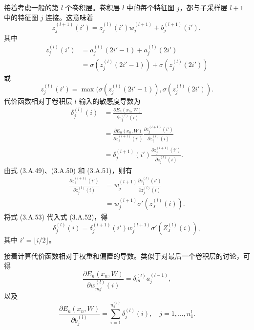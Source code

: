 
接着考虑一般的第 $l$ 个卷积层。卷积层 $l$ 中的每个特征图 $j$，都与子采样层 $l+1$ 中的特征图 $j$ 连接。这意味着
\begin{equation}
z_j^{(l+1)}(i')=z_j^{(l)}(i')w_j^{(l+1)}+b_j^{(l+1)}(i'),
\tag{3.A.49}
\end{equation}
其中
\begin{equation}
\begin{aligned}
z_j^{(l)}(i')&=a_j^{(l)}(2i'-1)+a_j^{(l)}(2i')\\
&=\sigma(z_j^{(l)}(2i'-1))+\sigma(z_j^{(l)}(2i'))
\end{aligned}
\tag{3.A.50}
\end{equation}
或
\begin{equation}
z_j^{(l)}(i')=\max(\sigma(z_j^{(l)}(2i'-1)),\sigma(z_j^{(l)}(2i')).
\tag{3.A.51}
\end{equation}
代价函数相对于卷积层 $l$ 输入的敏感度导数为
\begin{equation}
\begin{aligned}
\delta_j^{(l)}(i)
&=\frac{\partial E_n(x_n,W)}{\partial z_j^{(l)}(i)}\\
&=\frac{\partial E_n(x_n,W)}{\partial z_j^{(l+1)}(i')}
\frac{\partial z_j^{(l+1)}(i')}{\partial z_j^{(l)}(i)}\\
&=\delta_j^{(l+1)}(i')\frac{\partial z_j^{(l+1)}(i')}{\partial z_j^{(l)}(i)}.
\end{aligned}
\tag{3.A.52}
\end{equation}
由式 (3.A.49)、(3.A.50) 和 (3.A.51)，则有
\begin{equation}
\begin{aligned}
\frac{\partial z_j^{(l+1)}(i')}{\partial z_j^{(l)}(i)}
&=w_j^{(l+1)}\frac{\partial z_j^{(l)}(i')}{\partial z_j^{(l)}(i)}\\
&=w_j^{(l+1)}\sigma'(z_J^{(l)}(i)).
\end{aligned}
\tag{3.A.53}
\end{equation}
将式 (3.A.53) 代入式 (3.A.52)，得
\begin{equation}
\delta_j^{(l)}(i)=\delta_j^{(l+1)}(i')w_j^{(l+1)}\sigma'(Z_J^{(l)}(i)),
\tag{3.A.54}
\end{equation}
其中 $i'=\lfloor i/2\rfloor$。

接着计算代价函数相对于权重和偏置的导数。类似于对最后一个卷积层的讨论，可得
\begin{equation}
\frac{\partial E_n(x_n,W)}{\partial w_{mj}^{(l)}(i)}=\delta_m^{(l)}a_j^{(l-1)},
\tag{3.A.55}
\end{equation}
以及
\begin{equation}
\frac{\partial E_n(x_n,W)}{\partial b_j^{(l)}}
=\sum_{i=1}^{n_2^{(l)}}\delta_j^{(l)}(i),\quad j=1,\ldots,n_1^l.
\tag{3.A.56}
\end{equation}


